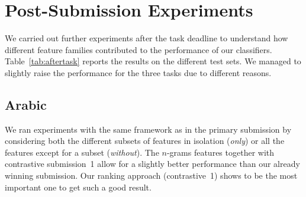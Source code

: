 \section{Post-Submission Experiments}
\label{sec:discussion}

We carried out further experiments after the task deadline to understand how 
different feature families contributed to the performance of our classifiers. 
Table~\ref{tab:aftertask} reports the results on the different test sets. We 
managed to slightly raise the performance for the three tasks due to different 
reasons.

\subsection{Arabic} \label{sec:discussionArabic}

We ran experiments with the same framework as in the primary submission by 
considering both the different subsets of features in isolation (\textit{only}) 
or all the features except for a subset (\textit{without}). The $n$-grams 
features together with contrastive submission~1 allow for a slightly better 
performance than our already winning submission. Our ranking approach 
(contrastive~1) shows to be the most important one to get such a good result.

